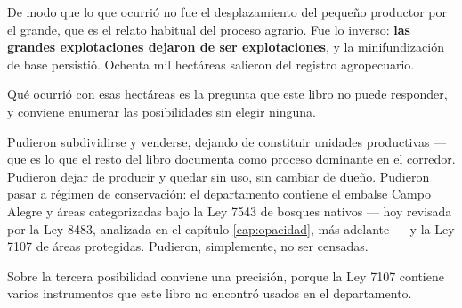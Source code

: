 De modo que lo que ocurrió no fue el desplazamiento del pequeño productor por el grande, que es el relato habitual del proceso agrario. Fue lo inverso: \textbf{las grandes explotaciones dejaron de ser explotaciones}, y la minifundización de base persistió. Ochenta mil hectáreas salieron del registro agropecuario.

\begin{cautela}
Qué ocurrió con esas hectáreas es la pregunta que este libro no puede responder, y conviene enumerar las posibilidades sin elegir ninguna.

Pudieron subdividirse y venderse, dejando de constituir unidades productivas --- que es lo que el resto del libro documenta como proceso dominante en el corredor. Pudieron dejar de producir y quedar sin uso, sin cambiar de dueño. Pudieron pasar a régimen de conservación: el departamento contiene el embalse Campo Alegre y áreas categorizadas bajo la Ley 7543 de bosques nativos --- hoy revisada por la Ley 8483, analizada en el capítulo \ref{cap:opacidad}, más adelante --- y la Ley 7107 de áreas protegidas. Pudieron, simplemente, no ser censadas.
\end{cautela}

Sobre la tercera posibilidad conviene una precisión, porque la Ley 7107 contiene varios instrumentos que este libro no encontró usados en el departamento.

